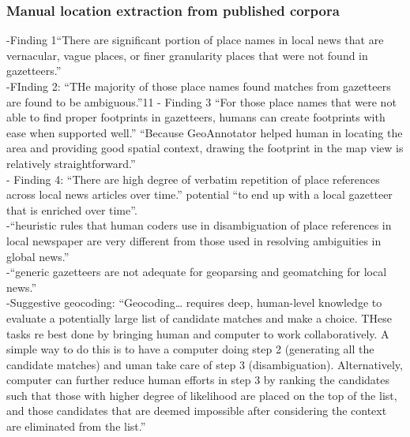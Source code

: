 \subsubsection{Manual location extraction from published corpora}
-{\color{orange}Finding 1“There are significant portion of place names in local news that are vernacular, vague places, or finer granularity places that were not found in gazetteers.”\cite{Cai2016}}\\
-{\color{orange}FInding 2: “THe majority of those place names found matches from gazetteers are found to be ambiguous.”\cite{Cai2016}}11
-{\color{orange} Finding 3 “For those place names that were not able to find proper footprints in gazetteers, humans can create footprints with ease when supported well.” “Because GeoAnnotator helped human in locating the area and providing good spatial context, drawing the footprint in the map view is relatively straightforward.”\cite{Cai2016}}\\
-{\color{orange} Finding 4: “There are high degree of verbatim repetition of place references across local news articles over time.” potential “to end up with a local gazetteer that is enriched over time”.\cite{Cai2016}}\\
-{\color{orange}“heuristic rules that human coders use in disambiguation of place references in local newspaper are very different from those used in resolving ambiguities in global news.”\cite{Cai2016}}\\
-{\color{orange}“generic gazetteers are not adequate for geoparsing and geomatching for local news.”\cite{Cai2016}}\\
-{\color{orange}Suggestive geocoding: “Geocoding… requires deep, human-level knowledge to evaluate a potentially large list of candidate matches and make a choice. THese tasks re best done by bringing human and computer to work collaboratively. A simple way to do this is to have a computer doing step 2 (generating all the candidate matches) and uman take care of step 3 (disambiguation). Alternatively, computer can further reduce human efforts in step 3 by ranking the candidates such that those with higher degree of likelihood are placed on the top of the list, and those candidates that are deemed impossible after considering the context are eliminated from the list.” \cite{Cai2016}}\\
